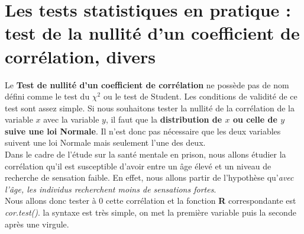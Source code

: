 \section{Les tests statistiques en pratique : test de la nullité d'un coefficient de corrélation, divers}
Le \textbf{Test de nullité d'un coefficient de corrélation} ne possède pas de nom défini comme le test du $\chi^{2}$ ou le test de Student.\newline 
Les conditions de validité de ce test sont assez simple. Si nous souhaitons tester la nullité de la corrélation de la variable $x$ avec la variable $y$, il faut que la \textbf{distribution de $x$ ou celle de $y$ suive une loi Normale}. Il n'est donc pas nécessaire que les deux variables suivent une loi Normale mais seulement l'une des deux.\newline
\\
Dans le cadre de l'étude sur la santé mentale en prison, nous allons étudier la corrélation qu'il est susceptible d'avoir entre un âge élevé et un niveau de recherche de sensation faible. En effet,  nous allons partir de l'hypothèse qu'\textit{avec l'âge, les individus recherchent moins de sensations fortes}.\newline
\\
Nous allons donc tester à $0$ cette corrélation et la fonction \textbf{R} correspondante est \textit{cor.test()}. la syntaxe est très simple, on met la première variable puis la seconde après une virgule.

